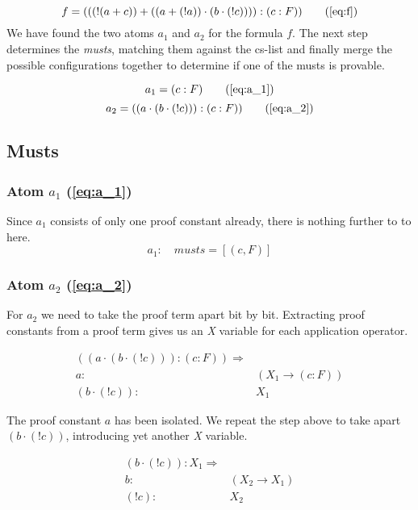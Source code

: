\begin{equation*}
		f = (((!(a+c))+((a+(!a))\cdot(b\cdot(!c)))):(c:F)) 
		\tag{\ref{eq:f}}  
\end{equation*}
We have found the two atoms $a_1$ and $a_2$ for the formula $f$. The next step determines the \emph{musts}, matching them against the cs-list and finally merge the possible configurations together to determine if one of the musts is provable.


\begin{equation*}
		a_1 = (c:F) 
		\tag{\ref{eq:a_1}}
\end{equation*}
\begin{equation*}		
		a_2 = ((a \cdot(b\cdot (! c))):(c:F)) 
		\tag{\ref{eq:a_2}}
\end{equation*}

\subsection{Musts}
\subsubsection[First atom]{Atom $a_1$ (\ref{eq:a_1})}
Since $a_1$ consists of only one proof constant already, there is nothing further to to here.
\begin{equation}
	a_1: \quad musts = [(c, F)]
\end{equation}

\subsubsection[Second atom]{Atom $a_2$ (\ref{eq:a_2})}
For $a_2$ we need to take the proof term apart bit by bit. Extracting proof constants from a proof term gives us an \emph{X} variable for each application operator. 

\begin{align*}\label{eq:musts1_a_2}
		((a \cdot(b\cdot (! c))):(c:F)) \Rightarrow & \\
		 a : &(X_1 \rightarrow (c:F)) \\
		 (b\cdot(! c)): &X_1
\end{align*}

The proof constant $a$ has been isolated. We repeat the step above to take apart $(b\cdot(! c))$, introducing yet another \emph{X} variable.

\begin{align*}
	(b\cdot(! c)): X_1 \Rightarrow & \\
	b : & (X_2 \rightarrow X_1) \\
	(! c) : & X_2
\end{align*}

